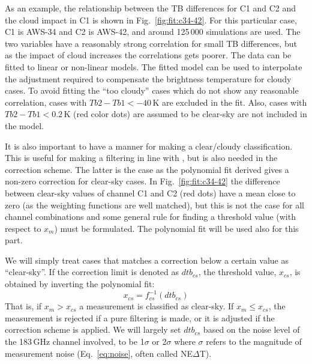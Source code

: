 \documentclass[12pt]{article}
\begin{document}
As an example, the relationship between the TB differences for C1 and C2 and
the cloud impact in C1 is shown in Fig.~\ref{fig:fit:c34-42}. For this
particular case, C1 is AWS-34 and C2 is AWS-42, and around 125\,000 simulations
are used. The two variables have a reasonably strong correlation for small TB
differences, but as the impact of cloud increases the correlations gets poorer.
The data can be fitted to linear or non-linear models. The fitted model can be
used to interpolate the adjustment required to compensate the brightness
temperature for cloudy cases. To avoid fitting the ``too cloudy'' cases which
do not show any reasonable correlation, cases with $Tb2-Tb1< -40$\,K are
excluded in the fit. Also, cases with $Tb2-Tb1 < 0.2$\,K (red color dots) are
assumed to be clear-sky are not included in the model.

It is also important to have a manner for making a clear/cloudy classification.
This is useful for making a filtering in line with \citep{rekha2012potential},
but is also needed in the correction scheme. The latter is the case as the
polynomial fit derived gives a non-zero correction for clear-sky cases. In
Fig.~\ref{fig:fit:c34-42} the difference between clear-sky values of channel C1
and C2 (red dots) have a mean close to zero (as the weighting functions are
well matched), but this is not the case for all channel combinations and some
general rule for finding a threshold value (with respect to $x_m$) must be
formulated. The polynomial fit will be used also for this part.


We will simply treat cases that matches a correction below a certain value as
``clear-sky''. If the correction limit is denoted as $dtb_{cs}$, the threshold
value, $x_{cs}$, is obtained by inverting the polynomial fit:
\begin{equation}
x_{cs} = f_{cs}^{-1}(dtb_{cs}) 
\label{eq:dtb}
\end{equation}
That is, if $x_m>x_{cs}$ a measurement is classified as clear-sky. If
$x_m\leq x_{cs}$, the measurement is rejected if a pure filtering is made, or
it is adjusted if the correction scheme is applied. We will largely set
$dtb_{cs}$ based on the noise level of the 183\,GHz channel involved, to be
1$\sigma$ or 2$\sigma$ where $\sigma$ refers to the magnitude of measurement
noise (Eq.~\ref{eq:noise}, often called NE$\Delta$T).
\end{document}

